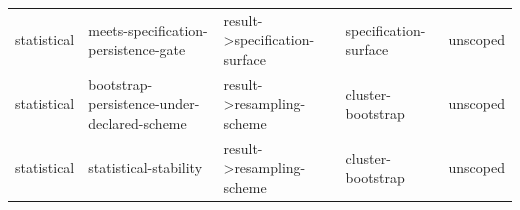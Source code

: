 \begin{table}[t]
\begin{tabular}{@{}p{}p{}p{}p{}p{}@{}}
    statistical & meets-specification-persistence-gate & result->specification-surface & specification-surface & unscoped \\
    statistical & bootstrap-persistence-under-declared-scheme & result->resampling-scheme & cluster-bootstrap & unscoped \\
    statistical & statistical-stability & result->resampling-scheme & cluster-bootstrap & unscoped \\
    \bottomrule
  \end{tabular}\par
  \medskip
  
\end{table}
